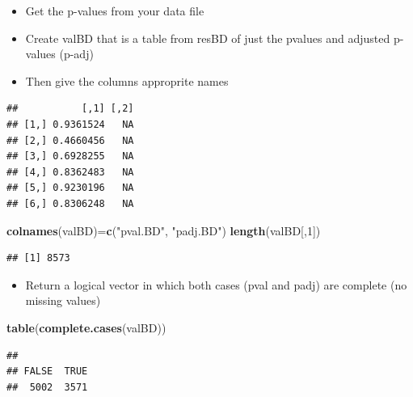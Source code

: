 \documentclass[
]{article}
\newenvironment{Shaded}{\begin{snugshade}}{\end{snugshade}}
\newcommand{\DecValTok}[1]{\textcolor[rgb]{0.00,0.00,0.81}{#1}}
\newcommand{\KeywordTok}[1]{\textcolor[rgb]{0.13,0.29,0.53}{\textbf{#1}}}
\newcommand{\NormalTok}[1]{#1}
\newcommand{\OperatorTok}[1]{\textcolor[rgb]{0.81,0.36,0.00}{\textbf{#1}}}
\newcommand{\StringTok}[1]{\textcolor[rgb]{0.31,0.60,0.02}{#1}}
\providecommand{\tightlist}{%
  \setlength{\itemsep}{0pt}\setlength{\parskip}{0pt}}
\begin{document}
\begin{itemize}
\tightlist
\item
  Get the p-values from your data file
\item
  Create valBD that is a table from resBD of just the pvalues and
  adjusted p-values (p-adj)
\item
  Then give the columns approprite names
\end{itemize}

\begin{Shaded}
\end{Shaded}

\begin{verbatim}
##           [,1] [,2]
## [1,] 0.9361524   NA
## [2,] 0.4660456   NA
## [3,] 0.6928255   NA
## [4,] 0.8362483   NA
## [5,] 0.9230196   NA
## [6,] 0.8306248   NA
\end{verbatim}

\begin{Shaded}
\begin{Highlighting}[]
\KeywordTok{colnames}\NormalTok{(valBD)=}\KeywordTok{c}\NormalTok{(}\StringTok{"pval.BD"}\NormalTok{, }\StringTok{"padj.BD"}\NormalTok{)}
\KeywordTok{length}\NormalTok{(valBD[,}\DecValTok{1}\NormalTok{])}
\end{Highlighting}
\end{Shaded}

\begin{verbatim}
## [1] 8573
\end{verbatim}

\begin{itemize}
\tightlist
\item
  Return a logical vector in which both cases (pval and padj) are
  complete (no missing values)
\end{itemize}

\begin{Shaded}
\begin{Highlighting}[]
\KeywordTok{table}\NormalTok{(}\KeywordTok{complete.cases}\NormalTok{(valBD))}
\end{Highlighting}
\end{Shaded}

\begin{verbatim}
## 
## FALSE  TRUE 
##  5002  3571
\end{verbatim}
\end{document}
